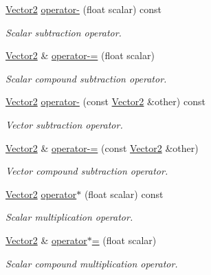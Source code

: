 \begin{DoxyCompactItemize}
\hyperlink{classchaos_1_1gfx_1_1_vector2}{Vector2} \hyperlink{classchaos_1_1gfx_1_1_vector2_a0f4f7749c5841b8ff46b5b60c1114863}{operator-\/} (float scalar) const 
\begin{DoxyCompactList}\small\item\em Scalar subtraction operator. \end{DoxyCompactList}\item 
\hyperlink{classchaos_1_1gfx_1_1_vector2}{Vector2} \& \hyperlink{classchaos_1_1gfx_1_1_vector2_ab9c69ad11e706040bf115e9c937b998f}{operator-\/=} (float scalar)
\begin{DoxyCompactList}\small\item\em Scalar compound subtraction operator. \end{DoxyCompactList}\item 
\hyperlink{classchaos_1_1gfx_1_1_vector2}{Vector2} \hyperlink{classchaos_1_1gfx_1_1_vector2_a5054c54e89586fdf158a5bc82ae3bb7f}{operator-\/} (const \hyperlink{classchaos_1_1gfx_1_1_vector2}{Vector2} \&other) const 
\begin{DoxyCompactList}\small\item\em Vector subtraction operator. \end{DoxyCompactList}\item 
\hyperlink{classchaos_1_1gfx_1_1_vector2}{Vector2} \& \hyperlink{classchaos_1_1gfx_1_1_vector2_a178eea30bced3cff00348c030ee0c105}{operator-\/=} (const \hyperlink{classchaos_1_1gfx_1_1_vector2}{Vector2} \&other)
\begin{DoxyCompactList}\small\item\em Vector compound subtraction operator. \end{DoxyCompactList}\item 
\hyperlink{classchaos_1_1gfx_1_1_vector2}{Vector2} \hyperlink{classchaos_1_1gfx_1_1_vector2_a3a082c7e2592573a665f3614af5ecd92}{operator$\ast$} (float scalar) const 
\begin{DoxyCompactList}\small\item\em Scalar multiplication operator. \end{DoxyCompactList}\item 
\hyperlink{classchaos_1_1gfx_1_1_vector2}{Vector2} \& \hyperlink{classchaos_1_1gfx_1_1_vector2_a7ec2f2358e64d1164652ad2f8acfc556}{operator$\ast$=} (float scalar)
\begin{DoxyCompactList}\small\item\em Scalar compound multiplication operator. \end{DoxyCompactList}\item 

\end{DoxyCompactItemize}
